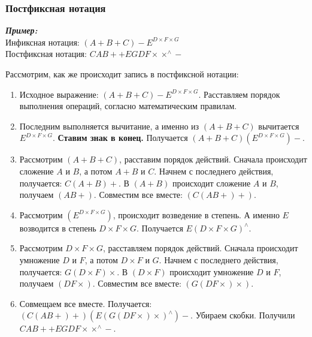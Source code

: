 \subsubsection{Постфиксная нотация}\label{subsubsec:postfix-notation}

\noindent\textbf{\emph{Пример:}} \\
Инфиксная нотация: $(A + B + C) - E^{D\times F\times G}$ \\
Постфиксная нотация: $CAB++EGDF\times\times ^{\wedge}-$

\bigskip\noindent
Рассмотрим, как же происходит запись в постфиксной нотации:
\begin{enumerate}
    \item   Исходное выражение: $(A + B + C) - E^{D\times F\times G}$.
            Расставляем порядок выполнения операций, согласно математическим правилам.
    \item   Последним выполняется вычитание, а именно из $(A + B + C)$ вычитается $E^{D\times F\times G}$.
            \textbf{Ставим знак в конец.}
            Получается $(A + B + C)(E^{D\times F\times G})-$.
    \item   Рассмотрим $(A + B + C)$, расставим порядок действий.
            Сначала происходит сложение $A$ и $B$, а потом $A+B$ и $C$.
            Начнем с последнего действия, получается: $C(A+B)+$.
            В $(A+B)$ происходит сложение $A$ и $B$, получаем $(AB+)$.
            Совместим все вместе: $(C(AB+)+)$.
    \item   Рассмотрим $(E^{D\times F\times G})$, происходит возведение в степень.
            А именно $E$ возводится в степень $D\times F\times G$.
            Получается $E{(D\times F\times G)}^{\wedge}$.
    \item   Рассмотрим $D\times F\times G$, расставляем порядок действий.
            Сначала происходит умножение $D$ и $F$, а потом $D\times F$ и $G$.
            Начнем с последнего действия, получается: $G(D \times F)\times$.
            В $(D \times F)$ происходит умножение $D$ и $F$, получаем $(DF\times)$.
            Совместим все вместе: $(G(DF\times )\times)$.
    \item   Совмещаем все вместе. Получается: $(C(AB+)+)(E{(G(DF\times)\times)}^{\wedge})-$.
            Убираем скобки.
            Получили $CAB++EGDF\times\times ^{\wedge}-$.
\end{enumerate}

